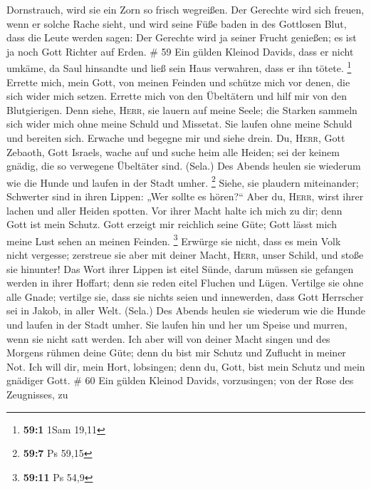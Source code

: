 Dornstrauch, wird sie ein Zorn so frisch wegreißen.  Der
Gerechte wird sich freuen, wenn er solche Rache sieht, und wird seine
Füße baden in des Gottlosen Blut,  dass die Leute werden
sagen: Der Gerechte wird ja seiner Frucht genießen; es ist ja noch Gott
Richter auf Erden. \# 59  Ein gülden Kleinod Davids, dass
er nicht umkäme, da Saul hinsandte und ließ sein Haus verwahren, dass er
ihn tötete. \footnote{\textbf{59:1} 1Sam 19,11}  Errette
mich, mein Gott, von meinen Feinden und schütze mich vor denen, die sich
wider mich setzen.  Errette mich von den Übeltätern und
hilf mir von den Blutgierigen.  Denn siehe, \textsc{Herr},
sie lauern auf meine Seele; die Starken sammeln sich wider mich ohne
meine Schuld und Missetat.  Sie laufen ohne meine Schuld
und bereiten sich. Erwache und begegne mir und siehe drein.
 Du, \textsc{Herr}, Gott Zebaoth, Gott Israels, wache auf
und suche heim alle Heiden; sei der keinem gnädig, die so verwegene
Übeltäter sind. (Sela.)  Des Abends heulen sie wiederum
wie die Hunde und laufen in der Stadt umher. \footnote{\textbf{59:7} Ps
  59,15}  Siehe, sie plaudern miteinander; Schwerter sind
in ihren Lippen: „Wer sollte es hören?{}``  Aber du,
\textsc{Herr}, wirst ihrer lachen und aller Heiden spotten.
 Vor ihrer Macht halte ich mich zu dir; denn Gott ist
mein Schutz.  Gott erzeigt mir reichlich seine Güte; Gott
lässt mich meine Lust sehen an meinen Feinden. \footnote{\textbf{59:11}
  Ps 54,9}  Erwürge sie nicht, dass es mein Volk nicht
vergesse; zerstreue sie aber mit deiner Macht, \textsc{Herr}, unser
Schild, und stoße sie hinunter!  Das Wort ihrer Lippen
ist eitel Sünde, darum müssen sie gefangen werden in ihrer Hoffart; denn
sie reden eitel Fluchen und Lügen.  Vertilge sie ohne
alle Gnade; vertilge sie, dass sie nichts seien und innewerden, dass
Gott Herrscher sei in Jakob, in aller Welt. (Sela.)  Des
Abends heulen sie wiederum wie die Hunde und laufen in der Stadt umher.
 Sie laufen hin und her um Speise und murren, wenn sie
nicht satt werden.  Ich aber will von deiner Macht singen
und des Morgens rühmen deine Güte; denn du bist mir Schutz und Zuflucht
in meiner Not.  Ich will dir, mein Hort, lobsingen; denn
du, Gott, bist mein Schutz und mein gnädiger Gott. \# 60 
Ein gülden Kleinod Davids, vorzusingen; von der Rose des Zeugnisses, zu

